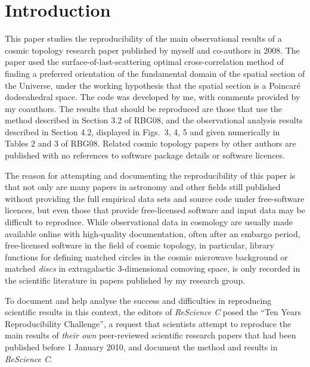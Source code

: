 

\abstract{\articleABSTRACT} %
\supercite{RBG08}

\section{Introduction}

This paper studies the reproducibility of the main observational
results of a cosmic topology research paper published by myself and
co-authors in 2008\supercite{RBG08}. The paper used the
surface-of-last-scattering optimal cross-correlation method of finding
a preferred orientation of the fundamental domain of the spatial
section of the Universe, under the working hypothesis that the spatial
section is a Poincaré dodecahedral space\supercite{LumNat03}. The
code was developed by me, with comments provided by my coauthors. The
results that should be reproduced are those that use the method
described in Section 3.2 of RBG08, and the observational analysis
results described in Section 4.2, displayed in Figs.~3, 4, 5 and given
numerically in Tables 2 and 3 of RBG08. Related cosmic topology papers
by other authors are published with no references to software package
details or software licences.

The reason for attempting and documenting the reproducibility of this
paper is that not only are many papers in astronomy\supercite{Allen18}
and other fields still published without providing the full
empirical data sets and source code under free-software licences,
but even those that provide free-licensed software and input data
may be difficult to reproduce\supercite{Ioannidis2009,Chang15,Stodden18}.
While observational data in cosmology are usually made available online
with high-quality documentation, often after an embargo period,
free-licensed software in the field of cosmic topology,
in particular, library functions
for defining matched circles in the cosmic microwave background
or matched \emph{discs} in extragalactic 3-dimensional comoving space\supercite{RK11},
is only recorded in the scientific literature in papers published by my research group.

To document and help analyse the success and difficulties in reproducing
scientific results in this context,
the editors of {\it ReScience C} posed the ``Ten Years Reproducibility
Challenge'', a request that scientists attempt to
reproduce the main results of \emph{their own}
peer-reviewed scientific research papers that had been
published before 1 January 2010, and document the method and results
in {\it ReScience C}\supercite{TenYrChallenge20}.

